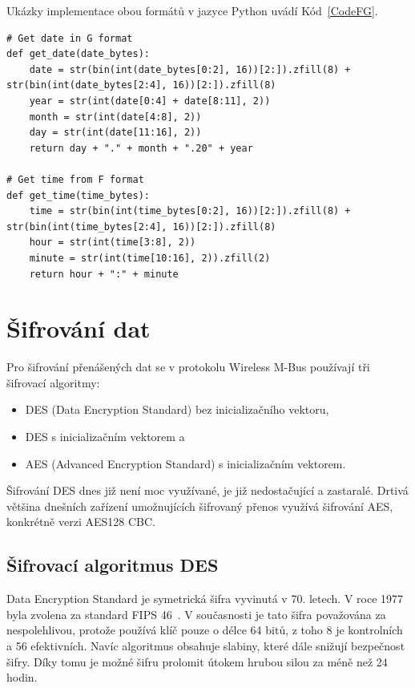 Ukázky implementace obou formátů v jazyce Python uvádí Kód~\ref{CodeFG}.

\begin{lstlisting}[caption={Implementace F a G formátu},captionpos=b,label=CodeFG,style=MyCodePython]
# Get date in G format
def get_date(date_bytes):
    date = str(bin(int(date_bytes[0:2], 16))[2:]).zfill(8) + str(bin(int(date_bytes[2:4], 16))[2:]).zfill(8)
    year = str(int(date[0:4] + date[8:11], 2))
    month = str(int(date[4:8], 2))
    day = str(int(date[11:16], 2))
    return day + "." + month + ".20" + year

# Get time from F format
def get_time(time_bytes):
    time = str(bin(int(time_bytes[0:2], 16))[2:]).zfill(8) + str(bin(int(time_bytes[2:4], 16))[2:]).zfill(8)
    hour = str(int(time[3:8], 2))
    minute = str(int(time[10:16], 2)).zfill(2)
    return hour + ":" + minute
\end{lstlisting}
	
\newpage{}	
	
\section{Šifrování dat}
Pro šifrování přenášených dat se v protokolu Wireless M-Bus používají tři šifrovací algoritmy:
\begin{itemize}
	\item DES (Data Encryption Standard) bez inicializačního vektoru,
	\item DES s inicializačním vektorem a
	\item AES (Advanced Encryption Standard) s inicializačním vektorem.
\end{itemize}

Šifrování DES dnes již není moc využívané, je již nedostačující a zastaralé. Drtivá většina dnešních zařízení umožnujících šifrovaný přenos využívá šifrování AES, konkrétně verzi AES128 CBC.

\subsection{Šifrovací algoritmus DES}
Data Encryption Standard je symetrická šifra vyvinutá v 70. letech. V roce 1977 byla zvolena za standard FIPS 46~\cite{NormaFIPS46}. V současnosti je tato šifra považována za nespolehlivou, protože používá klíč pouze o délce 64 bitů, z toho 8 je kontrolních a 56 efektivních. Navíc algoritmus obsahuje slabiny, které dále snižují bezpečnost šifry. Díky tomu je možné šifru prolomit útokem hrubou silou za méně než 24 hodin.

